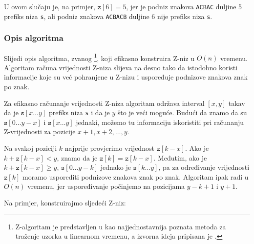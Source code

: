 U ovom slučaju je, na primjer, $\texttt{z}[6]=5$,
jer je podniz znakova \texttt{ACBAC} duljine 5
prefiks niza \texttt{s},
ali podniz znakova \texttt{ACBACB} duljine 6
nije prefiks niza \texttt{s}.

\subsubsection*{Opis algoritma}

Slijedi opis algoritma,
zvanog \footnote{Z-algoritam je
predstavljen u \cite{gus97} kao najjednostavnija poznata
metoda za traženje uzorka u linearnom vremenu, a izvorna ideja
pripisana je \cite{mai84}.},
koji efikasno konstruira Z-niz u $O(n)$ vremenu.
Algoritam računa vrijednosti Z-niza
slijeva na desno tako da istodobno koristi informacije
koje su već pohranjene u Z-nizu i uspoređuje podnizove znakova
znak po znak.

Za efikasno računanje vrijednosti Z-niza
algoritam održava interval $[x,y]$ takav da je
$\texttt{s}[x \ldots y]$ prefiks niza \texttt{s}
i da je $y$ što je veći moguće.
Budući da znamo da su $\texttt{s}[0 \ldots y-x]$
i $\texttt{s}[x \ldots y]$ jednaki,
možemo tu informaciju iskoristiti pri računanju
Z-vrijednosti za pozicije $x+1,x+2,\ldots,y$.

Na svakoj poziciji $k$ najprije
provjerimo vrijednost $\texttt{z}[k-x]$.
Ako je $k+\texttt{z}[k-x]<y$, znamo da je $\texttt{z}[k]=\texttt{z}[k-x]$.
Međutim, ako je $k+\texttt{z}[k-x] \ge y$,
$\texttt{s}[0 \ldots y-k]$ jednako je
$\texttt{s}[k \ldots y]$, pa za određivanje
vrijednosti $\texttt{z}[k]$ moramo usporediti
podnizove znakova znak po znak.
Algoritam ipak radi u $O(n)$ vremenu,
jer uspoređivanje počinjemo na pozicijama
$y-k+1$ i $y+1$.

Na primjer, konstruirajmo sljedeći Z-niz:

